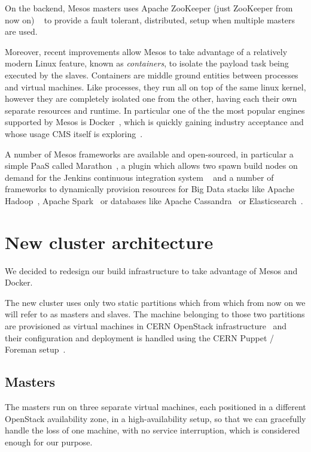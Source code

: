 \documentclass[a4paper]{jpconf}
\begin{document}
On the backend, Mesos masters uses Apache ZooKeeper (just ZooKeeper from now on)
~\cite{ZOOKEEPER} to provide a fault tolerant, distributed, setup when multiple
masters are used.

Moreover, recent improvements allow Mesos to take advantage of a relatively
modern Linux feature, known as \textit{containers}, to isolate the payload task
being executed by the slaves. Containers are middle ground entities between
processes and virtual machines. Like processes, they run all on top of the same
linux kernel, however they are completely isolated one from the other, having
each their own separate resources and runtime. In particular one of the the most
popular engines supported by Mesos is Docker~\cite{DOCKER}, which is quickly
gaining industry acceptance and whose usage CMS itself is
exploring~\cite{DOCKERPAPER}.

A number of Mesos frameworks are available and open-sourced, in particular a
simple PaaS called Marathon~\cite{MARATHON}, a plugin which allows two spawn
build nodes on demand for the Jenkins continuous integration system
~\cite{MESOSJENKINS} and a number of frameworks to dynamically provision
resources for Big Data stacks like Apache Hadoop~\cite{MESOSHADOOP}, Apache
Spark~\cite{MESOSSPARK} or databases like Apache Cassandra~\cite{MESOSCASSANDRA}
or Elasticsearch~\cite{MESOSELASTIC}.

\section{New cluster architecture}

We decided to redesign our build infrastructure to take advantage of Mesos and
Docker.

The new cluster uses only two static partitions which from which from now on we
will refer to as masters and slaves. The machine belonging to those two
partitions are provisioned as virtual machines in CERN OpenStack
infrastructure~\cite{CERNOPENSTACK} and their configuration and deployment is
handled using the CERN Puppet / Foreman setup~\cite{CERNCFG}.

\subsection{Masters}

The masters run on three separate virtual machines, each positioned in a
different OpenStack availability zone, in a high-availability setup, so that we
can gracefully handle the loss of one machine, with no service interruption,
which is considered enough for our purpose.
\end{document}

